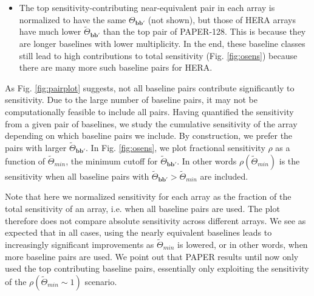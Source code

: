 \documentclass[twocolumn,apj,numberedappendix]{emulateapj}
\renewcommand\[{\begin{equation}}
\renewcommand\]{\end{equation}}
\begin{document}
\begin{itemize}
\item The top sensitivity-contributing near-equivalent pair in each array is normalized to have the same $\Theta_{\boldsymbol{bb'}}$ (not shown), but those of HERA arrays have much lower $\widetilde{\Theta}_{\boldsymbol{bb'}}$ than the top pair of PAPER-128. This is because they are longer baselines with lower multiplicity. In the end, these baseline classes still lead to high contributions to total sensitivity (Fig. \ref{fig:osens}) because there are many more such baseline pairs for HERA.  

\end{itemize}

As Fig. \ref{fig:pairplot} suggests, not all baseline pairs contribute significantly to sensitivity. Due to the large number of baseline pairs, it may not be computationally feasible to include all pairs. Having quantified the sensitivity from a given pair of baselines, we study the cumulative sensitivity of the array depending on which baseline pairs we include. By construction, we prefer the pairs with larger $\widetilde{\Theta}_{\boldsymbol{bb'}}$. In Fig. \ref{fig:osens}, we plot fractional sensitivity $\rho$ as a function of $\widetilde{\Theta}_{min}$, the minimum cutoff for $\widetilde{\Theta}_{\boldsymbol{bb'}}$. In other words $\rho(\widetilde{\Theta}_{min})$ is the sensitivity when all baseline pairs with $\widetilde{\Theta}_{\boldsymbol{bb'}}>\widetilde{\Theta}_{min}$ are included. 

Note that here we normalized sensitivity for each array as the fraction of the total sensitivity of an array, i.e. when all baseline pairs are used. The plot therefore does not compare absolute sensitivity across different arrays. We see as expected that in all cases, using the nearly equivalent baselines leads to increasingly significant improvements as $\widetilde{\Theta}_{min}$ is lowered, or in other words, when more baseline pairs are used. We point out that PAPER results until now \citep{Ali2015, paper32} only used the top contributing baseline pairs, essentially only exploiting the sensitivity of the $\rho(\widetilde{\Theta}_{min}\sim 1)$ scenario. 
\end{document}
